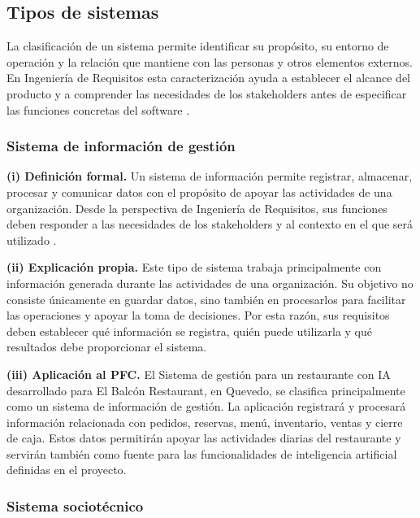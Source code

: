 \subsection{Tipos de sistemas}
La clasificación de un sistema permite identificar su propósito, su entorno
de operación y la relación que mantiene con las personas y otros elementos
externos. En Ingeniería de Requisitos esta caracterización ayuda a establecer
el alcance del producto y a comprender las necesidades de los stakeholders
antes de especificar las funciones concretas del software
\cite{ieee29148,pohl2025}.

\subsubsection{Sistema de información de gestión}

\textbf{(i) Definición formal.}
Un sistema de información permite registrar, almacenar, procesar y comunicar
datos con el propósito de apoyar las actividades de una organización. Desde
la perspectiva de Ingeniería de Requisitos, sus funciones deben responder a
las necesidades de los stakeholders y al contexto en el que será utilizado
\cite{ieee29148,pohl2025}.

\textbf{(ii) Explicación propia.}
Este tipo de sistema trabaja principalmente con información generada durante
las actividades de una organización. Su objetivo no consiste únicamente en
guardar datos, sino también en procesarlos para facilitar las operaciones y
apoyar la toma de decisiones. Por esta razón, sus requisitos deben establecer
qué información se registra, quién puede utilizarla y qué resultados debe
proporcionar el sistema.

\textbf{(iii) Aplicación al PFC.}
El Sistema de gestión para un restaurante con IA desarrollado para
El Balcón Restaurant, en Quevedo, se clasifica principalmente como un sistema
de información de gestión. La aplicación registrará y procesará información
relacionada con pedidos, reservas, menú, inventario, ventas y cierre de caja.
Estos datos permitirán apoyar las actividades diarias del restaurante y
servirán también como fuente para las funcionalidades de inteligencia
artificial definidas en el proyecto.

\subsubsection{Sistema sociotécnico}

